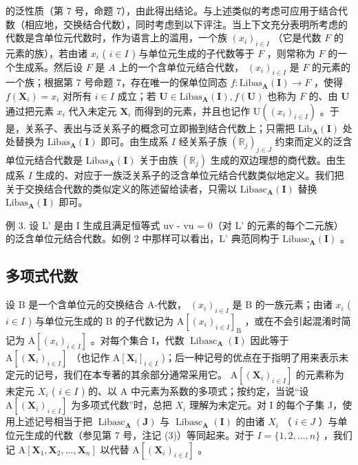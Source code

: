 的泛性质（第 7 号，命题 7），由此得出结论。与上述类似的考虑可应用于结合代数（相应地，交换结合代数），同时考虑到以下评注。当上下文充分表明所考虑的代数是含单位元代数时，作为语言上的滥用，一个族 \((x_{i})_{i\in I}\) （它是代数 \(F\) 的元素的族），若由诸 \(x_{i}\) ( \(i\in I\) ) 与单位元生成的子代数等于 \(F\) ，则常称为 \(F\) 的一个生成系。然后设 \(F\) 是 \(A\) 上的一个含单位元结合代数， \((x_{i})_{i\in I}\) 是 \(F\) 的元素的一个族；根据第 7 号命题 7，存在唯一的保单位同态 \(f:\mathrm{Libas}_{\mathbf{A}}(\mathbf{I})\to F\) ，使得 \(f(\mathbf{X}_i) = x_i\) 对所有 \(i\in I\) 成立；若 \(\mathbf{U}\in \mathrm{Libas}_{\mathbf{A}}(\mathbf{I}), f(\mathbf{U})\) 也称为 \(F\) 的、由 \(\mathbf{U}\) 通过把元素 \(x_{i}\) 代入未定元 \(\mathbf{X}_i\) 而得到的元素，并且也记作 \(\mathrm{U}((x_{i})_{i\in I})\) 。于是，关系子、表出与泛关系子的概念可立即搬到结合代数上；只需把 \(\mathrm{Lib}_{\mathbf{A}}(\mathbf{I})\) 处处替换为 \(\mathrm{Libas}_{\mathbf{A}}(\mathbf{I})\) 即可。由生成系 \(I\) 经关系子族 \((\mathbb{R}_j)_{j\in J}\) 约束而定义的泛含单位元结合代数是 \(\mathrm{Libas}_{\mathbf{A}}(\mathbf{I})\) 关于由族 \((\mathbb{R}_j)\) 生成的双边理想的商代数。由生成系 \(I\) 生成的、对应于一族泛关系子的泛含单位元结合代数类似地定义。我们把关于交换结合代数的类似定义的陈述留给读者，只需以 \(\mathrm{Libasc}_{\mathbf{A}}(\mathbf{I})\) 替换 \(\mathrm{Libas}_{\mathbf{A}}(\mathbf{I})\) 即可。

例 3. 设 L' 是由 I 生成且满足恒等式 uv - vu = 0（对 L' 的元素的每个二元族）的泛含单位元结合代数。如例 2 中那样可以看出，L' 典范同构于 \(\text{Libasc}_{\mathbf{A}}(\mathbf{I})\) 。

\subsection{多项式代数}

设 B 是一个含单位元的交换结合 A-代数， \((x_{i})_{i\in I}\) 是 B 的一族元素；由诸 \(x_{i}\) ( \(i\in I\) ) 与单位元生成的 B 的子代数记为 \(\mathrm{A}[(x_{i})_{i\in I}]_{\mathrm{B}}\) ，或在不会引起混淆时简记为 \(\mathrm{A}[(x_{i})_{i\in I}]\) 。对每个集合 I，代数 \(\operatorname{Libasc}_{\mathbf{A}}(\mathbf{I})\) 因此等于 \(\mathrm{A}[(\mathbf{X}_{i})_{i\in I}]\) （也记作 \(\mathrm{A}[\mathbf{X}_{i}]_{i\in I}\) )；后一种记号的优点在于指明了用来表示未定元的记号，我们在本专著的其余部分通常采用它。 \(\mathrm{A}[(\mathbf{X}_{i})_{i\in I}]\) 的元素称为未定元 \(X_{i}\) ( \(i\in I\) ) 的、以 A 中元素为系数的多项式；按约定，当说“设 \(\mathrm{A}[(\mathbf{X}_{i})_{i\in I}]\) 为多项式代数”时，总把 \(X_{i}\) 理解为未定元。对 I 的每个子集 J，使用上述记号相当于把 \(\operatorname{Libasc}_{\mathbf{A}}(\mathbf{J})\) 与 \(\operatorname{Libasc}_{\mathbf{A}}(\mathbf{I})\) 的由诸 \(X_{i}\) （ \(i\in J\) ）与单位元生成的代数（参见第 7 号，注记 (3)）等同起来。对于 \(I=\{1,2,\ldots,n\}\) ，我们记 \(\mathrm{A}[\mathbf{X}_{1},\mathbf{X}_{2},\ldots,\mathbf{X}_{n}]\) 以代替 \(\mathrm{A}[(\mathbf{X}_{i})_{i\in I}]\) 。

